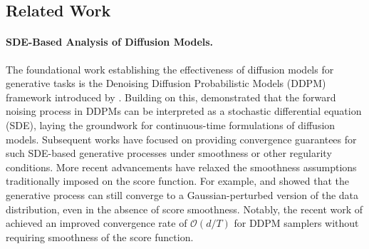 \documentclass[11pt]{article}
\begin{document}
\subsection{Related Work}

\paragraph{SDE-Based Analysis of Diffusion Models.}
The foundational work establishing the effectiveness of diffusion models for generative tasks is the Denoising Diffusion Probabilistic Models (DDPM) framework introduced by \cite{ho2020denoising}. Building on this, \cite{song2020score} demonstrated that the forward noising process in DDPMs can be interpreted as a stochastic differential equation (SDE), laying the groundwork for continuous-time formulations of diffusion models. Subsequent works \cite{chen2022sampling,li2023towards, li2024towards, lee2022convergence} have focused on providing convergence guarantees for such SDE-based generative processes under smoothness or other regularity conditions.
More recent advancements have relaxed the smoothness assumptions traditionally imposed on the score function. For example, \cite{chen2023improved} and \cite{benton2023nearly} showed that the generative process can still converge to a Gaussian-perturbed version of the data distribution, even in the absence of score smoothness. Notably, the recent work of \cite{li2024d} achieved an improved convergence rate of $\mathcal{O}(d/T)$ for DDPM samplers without requiring smoothness of the score function. 
\end{document}
